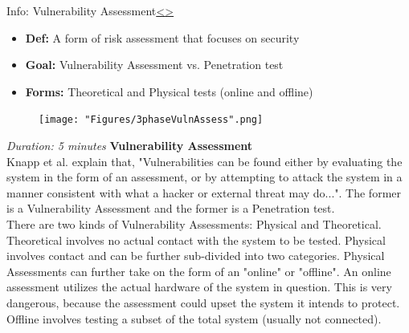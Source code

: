 \documentclass[12pt]{extarticle}
\newenvironment{instructionblock}{\Large\bgroup}{\egroup}
\newcommand{\bi}{\begin{itemize}}
\newcommand{\ei}{\end{itemize}}
\newcounter{next}
\newcounter{prev}
\begin{document}
\pagebreak
{}
\begin{slide}{Info: Vulnerability Assessment}{\hyperref[slide \theprev]{\textless}\hyperref[slide \thenext]{\textgreater}}
	\begin{instructionblock}
		\bi
			\item[]\textbf{Def:} A form of risk assessment that focuses on security
			\item[]\textbf{Goal:} Vulnerability Assessment vs. Penetration test
			\item[]\textbf{Forms:} Theoretical and Physical tests (online and offline)
		\ei
		\begin{figure}[H]
			\centering
			\texttt{[image: "Figures/3phaseVulnAssess".png]}
		\end{figure}
	\end{instructionblock}
\end{slide}
\textit{Duration: 5 minutes}
\vfill
\noindent
\textbf{Vulnerability Assessment}\\
Knapp et al. explain that, "Vulnerabilities can be found either by evaluating the system in the form of an assessment, or by attempting to attack the system in a manner consistent with what a hacker or external threat may do..."\cite{KnappLangill}. The former is a Vulnerability Assessment and the former is a Penetration test.\\
There are two kinds of Vulnerability Assessments: Physical and Theoretical. Theoretical involves no actual contact with the system to be tested. Physical involves contact and can be further sub-divided into two categories. Physical Assessments can further take on the form of an "online" or "offline". An online assessment utilizes the actual hardware of the system in question. This is very dangerous, because the assessment could upset the system it intends to protect. Offline involves testing a subset of the total system (usually not connected).\cite{KnappLangill}
\pagebreak

\end{document}
